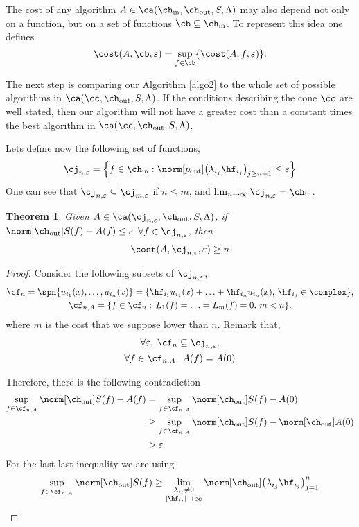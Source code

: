 \documentclass[final]{elsarticle}
\newcommand{\chin}{\ch_{\text{\rm{in}}}}
\newcommand{\chout}{\ch_{\text{\rm{out}}}}
\newcommand{\pout}{p_{\text{\rm{out}}}}
\newtheorem{theorem}{Theorem}
\theoremstyle{definition}
\theoremstyle{remark}
\begin{document}
The cost of any algorithm $A\in\ca(\chin,\chout,S,\Lambda)$ may also depend not only on a function, but on a set of functions $\cb\subseteq\chin$. To represent this idea one defines
\begin{equation*}
\cost(A,\cb,\varepsilon)=\sup_{f\in\cb}\{\cost(A,f;\varepsilon)\}.
\end{equation*}

The next step is comparing our Algorithm \ref{algo2} to the whole set of possible algorithms in $\ca(\cc,\chout,S,\Lambda)$. If the conditions describing the cone $\cc$ are well stated, then our algorithm will not have a greater cost than a constant times the best algorithm in $\ca(\cc,\chout,S,\Lambda)$.

Lets define now the following set of functions,
\begin{equation*}
\cj_{n,\varepsilon}=\left\{f\in\chin:\norm[\pout]{\left(\lambda_{i_j} \hf_{i_j} \right)_{j\ge n+1}} \le \varepsilon \right\}
\end{equation*}
One can see that $\cj_{n,\varepsilon}\subseteq\cj_{m,\varepsilon}$ if $n\le m$, and $\lim_{n\rightarrow\infty}\cj_{n,\varepsilon}=\chin$.
\begin{theorem}\label{supcost}
   Given $A\in\ca(\cj_{n,\varepsilon},\chout,S,\Lambda)$, if $\,$ $\norm[\chout]{S(f)-A(f)}\le\varepsilon$ $\forall f\in\cj_{n,\varepsilon}$, then
 \begin{equation*}
 \cost(A,\cj_{n,\varepsilon},\varepsilon)\ge n
 \end{equation*}
\end{theorem}
\begin{proof}
Consider the following subsets of $\cj_{n,\varepsilon}$,
\begin{gather*}
\cf_n=\spn\{u_{i_1}(x),\ldots,u_{i_n}(x)\}=\{\hf_{i_1}u_{i_1}(x)+\ldots+\hf_{i_n}u_{i_n}(x),\, \hf_{i_j}\in\complex\},\\
\cf_{n,A}=\{f\in\cf_n:\, L_1(f)=\ldots=L_m(f)=0,\, m<n\}.
\end{gather*}
where $m$ is the cost that we suppose lower than $n$. Remark that,
\begin{gather*}
 \forall\varepsilon,\;\cf_n\subseteq\cj_{n,\varepsilon},\\
 \forall f\in\cf_{n,A},\;A(f)=A(0)
\end{gather*}

Therefore, there is the following contradiction
\begin{align*}
\sup_{f\in\cf_{n,A}}\norm[\chout]{S(f)-A(f)}&=\sup_{f\in\cf_{n,A}}\norm[\chout]{S(f)-A(0)}\\
&\ge\sup_{f\in\cf_{n,A}}\norm[\chout]{S(f)}-\norm[\chout]{A(0)}\\
&>\varepsilon
\end{align*}
For the last last inequality we are using
\begin{equation*}
\sup_{f\in\cf_{n,A}}\norm[\chout]{S(f)}\ge\lim_{\substack{\lambda_{i_l}\neq 0 \\ |\hf_{i_l}|\rightarrow\infty}}\norm[\chout]{\left(\lambda_{i_j} \hf_{i_j} \right)_{j=1}^n}
\end{equation*}
\end{proof}
\end{document}
